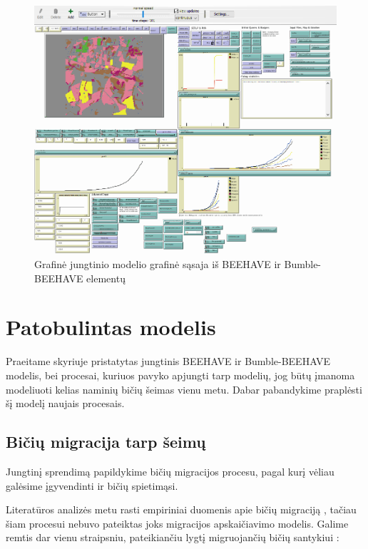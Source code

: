 \documentclass{VUMIFKompMagistrinis}
\begin{document}
\begin{figure}[H]
    \centering
    \includegraphics[scale=0.5]{img/new/gui.png}
    \caption{Grafinė jungtinio modelio grafinė sąsaja iš BEEHAVE ir Bumble-BEEHAVE elementų}
    \label{img:gui1}
\end{figure}



\section{Patobulintas modelis}

Praeitame skyriuje pristatytas jungtinis BEEHAVE ir Bumble-BEEHAVE modelis, bei procesai, kuriuos pavyko apjungti tarp modelių, jog būtų įmanoma modeliuoti kelias naminių bičių šeimas vienu metu. Dabar pabandykime praplėsti šį modelį naujais procesais. %




\subsection{Bičių migracija tarp šeimų}
Jungtinį sprendimą papildykime bičių migracijos procesu, pagal kurį vėliau galėsime įgyvendinti ir bičių spietimąsi.

Literatūros analizės metu rasti empiriniai duomenis apie bičių migraciją \cite{PfC98, BPC16}, tačiau šiam procesui nebuvo pateiktas joks migracijos apskaičiavimo modelis. Galime remtis dar vienu straipsniu, pateikiančiu lygtį migruojančių bičių santykiui \cite{FNF15}:
\end{document}
